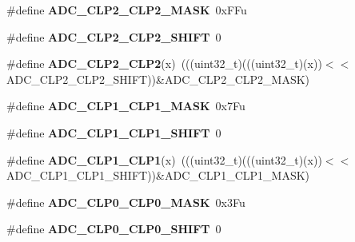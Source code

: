 \begin{DoxyCompactItemize}
\item 
\#define {\bfseries A\+D\+C\+\_\+\+C\+L\+P2\+\_\+\+C\+L\+P2\+\_\+\+M\+A\+SK}~0x\+F\+Fu\hypertarget{group__ADC__Register__Masks_ga2d10a369ac0c13f4ee3535e9f45a5d17}{}\label{group__ADC__Register__Masks_ga2d10a369ac0c13f4ee3535e9f45a5d17}

\item 
\#define {\bfseries A\+D\+C\+\_\+\+C\+L\+P2\+\_\+\+C\+L\+P2\+\_\+\+S\+H\+I\+FT}~0\hypertarget{group__ADC__Register__Masks_ga071963a7a6ff4f1b72c79c66aee09043}{}\label{group__ADC__Register__Masks_ga071963a7a6ff4f1b72c79c66aee09043}

\item 
\#define {\bfseries A\+D\+C\+\_\+\+C\+L\+P2\+\_\+\+C\+L\+P2}(x)~(((uint32\+\_\+t)(((uint32\+\_\+t)(x))$<$$<$A\+D\+C\+\_\+\+C\+L\+P2\+\_\+\+C\+L\+P2\+\_\+\+S\+H\+I\+FT))\&A\+D\+C\+\_\+\+C\+L\+P2\+\_\+\+C\+L\+P2\+\_\+\+M\+A\+SK)\hypertarget{group__ADC__Register__Masks_ga9b88c4499b2da56a5919cb15dcdc5dab}{}\label{group__ADC__Register__Masks_ga9b88c4499b2da56a5919cb15dcdc5dab}

\item 
\#define {\bfseries A\+D\+C\+\_\+\+C\+L\+P1\+\_\+\+C\+L\+P1\+\_\+\+M\+A\+SK}~0x7\+Fu\hypertarget{group__ADC__Register__Masks_ga597fddbb6d859ea54a49dd4a1eea72fb}{}\label{group__ADC__Register__Masks_ga597fddbb6d859ea54a49dd4a1eea72fb}

\item 
\#define {\bfseries A\+D\+C\+\_\+\+C\+L\+P1\+\_\+\+C\+L\+P1\+\_\+\+S\+H\+I\+FT}~0\hypertarget{group__ADC__Register__Masks_gab34e145666bb569d17f381665d6f5156}{}\label{group__ADC__Register__Masks_gab34e145666bb569d17f381665d6f5156}

\item 
\#define {\bfseries A\+D\+C\+\_\+\+C\+L\+P1\+\_\+\+C\+L\+P1}(x)~(((uint32\+\_\+t)(((uint32\+\_\+t)(x))$<$$<$A\+D\+C\+\_\+\+C\+L\+P1\+\_\+\+C\+L\+P1\+\_\+\+S\+H\+I\+FT))\&A\+D\+C\+\_\+\+C\+L\+P1\+\_\+\+C\+L\+P1\+\_\+\+M\+A\+SK)\hypertarget{group__ADC__Register__Masks_gaf48a7a2edeb5d0485c5cdfdf19bd3e18}{}\label{group__ADC__Register__Masks_gaf48a7a2edeb5d0485c5cdfdf19bd3e18}

\item 
\#define {\bfseries A\+D\+C\+\_\+\+C\+L\+P0\+\_\+\+C\+L\+P0\+\_\+\+M\+A\+SK}~0x3\+Fu\hypertarget{group__ADC__Register__Masks_ga7a8099e7e4fcb450308767ab0df8e458}{}\label{group__ADC__Register__Masks_ga7a8099e7e4fcb450308767ab0df8e458}

\item 
\#define {\bfseries A\+D\+C\+\_\+\+C\+L\+P0\+\_\+\+C\+L\+P0\+\_\+\+S\+H\+I\+FT}~0\hypertarget{group__ADC__Register__Masks_gad3035c445e10948c653ac0a028008109}{}\label{group__ADC__Register__Masks_gad3035c445e10948c653ac0a028008109}


\end{DoxyCompactItemize}

